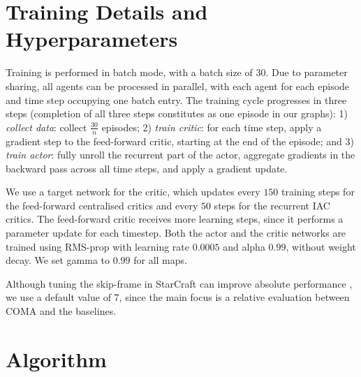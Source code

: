 \documentclass[letterpaper]{article}
\newcommand{\citep}{\cite}
\begin{document}
\section{Training Details and Hyperparameters}

Training is performed in batch mode, with a batch size of 30. Due to parameter 
sharing,  all agents can be processed in parallel, with each agent for each 
episode and time step occupying one batch entry. The training cycle progresses 
in three steps (completion of all three steps constitutes as one episode in our 
graphs):
1) \emph{collect data}: collect $\frac{30}{n}$ episodes;
2) \emph{train critic}: for each time step, apply a gradient step to the 
feed-forward critic, starting at the end of the episode; and
3) \emph{train actor}: fully unroll the recurrent part of the actor, aggregate 
gradients in the backward pass across all time steps, and apply a gradient 
update. 

We use a target network for the critic, which updates every $150$ training 
steps for the feed-forward centralised critics and every $50$ steps for the 
recurrent IAC critics. The feed-forward critic receives more learning steps, 
since it performs a parameter update for each timestep. Both the actor and the 
critic networks are trained using RMS-prop with learning rate $0.0005$ and 
alpha $0.99$, without weight decay.  We set gamma to $0.99$ for all maps.

Although tuning the skip-frame in StarCraft can improve absolute 
performance \citep{peng2017multiagent}, we use a default value of 7, since the 
main focus is a relative evaluation between COMA and the baselines.

\section{Algorithm}
\end{document}
